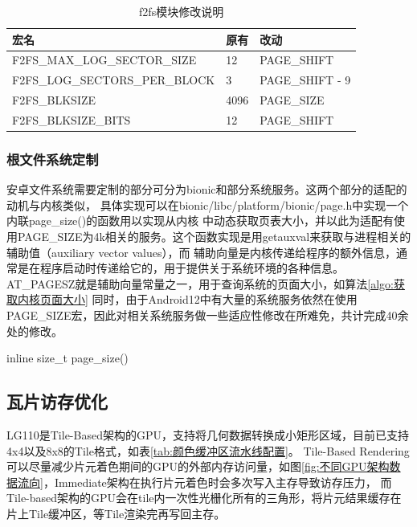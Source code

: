 \begin{table}[h]
  \centering
  \caption{f2fs模块修改说明}
  \label{tab:f2fs模块修改说明}
  \begin{tabular}{lll}
    \toprule
    宏名   &   原有  &改动  \\
    \midrule
    F2FS\_MAX\_LOG\_SECTOR\_SIZE & 12 & PAGE\_SHIFT \\
    F2FS\_LOG\_SECTORS\_PER\_BLOCK & 3 & PAGE\_SHIFT - 9 \\
    F2FS\_BLKSIZE & 4096 & PAGE\_SIZE \\
    F2FS\_BLKSIZE\_BITS & 12 & PAGE\_SHIFT \\
    \bottomrule
  \end{tabular}
  \note{}
\end{table}

\subsubsection{根文件系统定制}
安卓文件系统需要定制的部分可分为bionic和部分系统服务。这两个部分的适配的动机与内核类似，
具体实现可以在bionic/libc/platform/bionic/page.h中实现一个内联page\_size()的函数用以实现从内核
中动态获取页表大小，并以此为适配有使用PAGE\_SIZE为4k相关的服务。这个函数实现是用getauxval来获取与进程相关的辅助值（auxiliary vector values），而
辅助向量是内核传递给程序的额外信息，通常是在程序启动时传递给它的，用于提供关于系统环境的各种信息。AT\_PAGESZ就是辅助向量常量之一，用于查询系统的页面大小，如算法\ref{algo:获取内核页面大小}
同时，由于Android12中有大量的系统服务依然在使用PAGE\_SIZE宏，因此对相关系统服务做一些适应性修改在所难免，共计完成40余处的修改。
\begin{algorithm}
  \SetAlgoLined
  inline size\_t page\_size(){\\
  }
  \caption{获取内核页面大小}
  \label{algo:获取内核页面大小}
\end{algorithm}

\subsection{瓦片访存优化}
LG110是Tile-Based架构的GPU，支持将几何数据转换成小矩形区域，目前已支持4x4以及8x8的Tile格式，如表\ref{tab:颜色缓冲区流水线配置}。
Tile-Based Rendering可以尽量减少片元着色期间的GPU的外部内存访问量，如图\ref{fig:不同GPU架构数据流向}，Immediate架构在执行片元着色时会多次写入主存导致访存压力，
而Tile-based架构的GPU会在tile内一次性光栅化所有的三角形，将片元结果缓存在片上Tile缓冲区，等Tile渲染完再写回主存。


